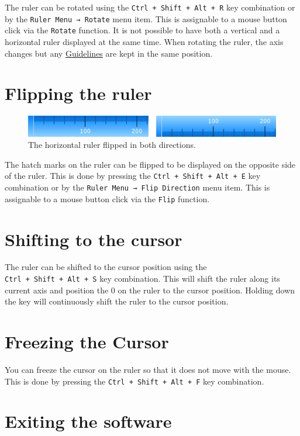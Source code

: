 \documentclass[
]{book}
\begin{document}
The ruler can be rotated using the \texttt{Ctrl\ +\ Shift\ +\ Alt\ +\ R} key combination or by the \texttt{Ruler\ Menu\ →\ Rotate} menu item.
This is assignable to a mouse button click via the \texttt{Rotate} function.
It is not possible to have both a vertical and a horizontal ruler displayed at the same time.
When rotating the ruler, the axis changes but any \hyperref[guidelines]{Guidelines} are kept in the same position.

\section{Flipping the ruler}\label{flip}

\begin{figure}
\centering
\includegraphics{images/ruler-flipped.png}
\caption{\label{fig:unnamed-chunk-2}The horizontal ruler flipped in both directions.}
\end{figure}

The hatch marks on the ruler can be flipped to be displayed on the opposite side of the ruler.
This is done by pressing the \texttt{Ctrl\ +\ Shift\ +\ Alt\ +\ E} key combination or by the \texttt{Ruler\ Menu\ →\ Flip\ Direction} menu item.
This is assignable to a mouse button click via the \texttt{Flip} function.

\section{Shifting to the cursor}\label{shifttocursor}

The ruler can be shifted to the cursor position using the \texttt{Ctrl\ +\ Shift\ +\ Alt\ +\ S} key combination.
This will shift the ruler along its current axis and position the 0 on the ruler to the cursor position.
Holding down the key will continuously shift the ruler to the cursor position.

\section{Freezing the Cursor}\label{freeze}

You can freeze the cursor on the ruler so that it does not move with the mouse.
This is done by pressing the \texttt{Ctrl\ +\ Shift\ +\ Alt\ +\ F} key combination.

\section{Exiting the software}\label{exit}
\end{document}
